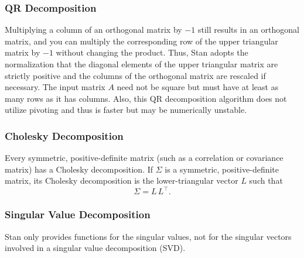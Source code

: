 \subsubsection{QR Decomposition}

\begin{description}
%
%
%
\end{description}
%
Multiplying a column of an orthogonal matrix by $-1$ still results in 
an orthogonal matrix, and you can multiply the corresponding row of 
the upper triangular matrix by $-1$ without changing the product. Thus,
Stan adopts the normalization that the diagonal elements of the upper
triangular matrix are strictly positive and the columns of the 
orthogonal matrix are rescaled if necessary. The input matrix $A$ need
not be square but must have at least as many rows as it has columns.
Also, this QR decomposition algorithm does not utilize pivoting and 
thus is faster but may be numerically unstable.

\subsubsection{Cholesky Decomposition}

Every symmetric, positive-definite matrix (such as a correlation or
covariance matrix) has a Cholesky decomposition.  If $\Sigma$ is a
symmetric, positive-definite matrix, its Cholesky decomposition is the
lower-triangular vector $L$ such that
\[
\Sigma = L \, L^{\top}.
\]

\begin{description}
%
% 
\end{description}

\subsubsection{Singular Value Decomposition}

Stan only provides functions for the singular values, not for the
singular vectors involved in a singular value decomposition (SVD).

\begin{description}
%
%
\end{description}


